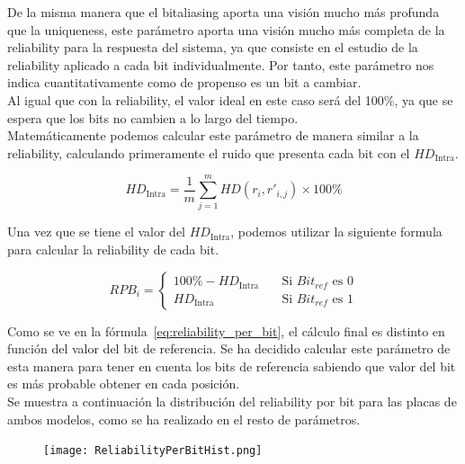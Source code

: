 \documentclass[spanish]{template/minim}
\begin{document}
De la misma manera que el bitaliasing aporta una visión mucho más profunda que la uniqueness, este parámetro aporta una visión mucho más completa de la reliability para la respuesta del sistema, ya que consiste en el estudio de la reliability aplicado a cada bit individualmente. Por tanto, este parámetro nos indica cuantitativamente como de propenso es un bit a cambiar.\\

Al igual que con la reliability, el valor ideal en este caso será del 100\%, ya que se espera que los bits no cambien a lo largo del tiempo.\\

Matemáticamente podemos calcular este parámetro de manera similar a la reliability, calculando primeramente el ruido que presenta cada bit con el $HD_{\text{Intra}}$.

\begin{equation}
    HD_{\text{Intra}} = \frac{1}{m} \sum\limits^m_{j=1} HD(r_i, r'_{i,j}) \times 100\%
    \label{eq:hd_intra_rpb}
\end{equation}

Una vez que se tiene el valor del $HD_{\text{Intra}}$, podemos utilizar la siguiente formula para calcular la reliability de cada bit.

\begin{equation}
    RPB_{i} =
    \begin{cases}
        100\% - HD_{\text{Intra}} & \quad \text{Si } Bit_{ref} \text{ es 0}\\
        HD_{\text{Intra}}  & \quad \text{Si } Bit_{ref} \text{ es 1}
    \end{cases}
    \label{eq:reliability_per_bit}
\end{equation}


Como se ve en la fórmula~\ref{eq:reliability_per_bit}, el cálculo final es distinto en función del valor del bit de referencia. Se ha decidido calcular este parámetro de esta manera para tener en cuenta los bits de referencia sabiendo que valor del bit es más probable obtener en cada posición.\\

Se muestra a continuación la distribución del reliability por bit para las placas de ambos modelos, como se ha realizado en el resto de parámetros.\\

\begin{figure}[H]
    \centering
    \texttt{[image: ReliabilityPerBitHist.png]}

\end{figure}
\end{document}
